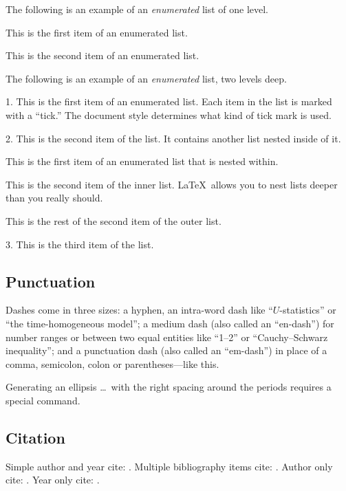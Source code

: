 \documentclass[aoas]{imsart}
\theoremstyle{plain}
\theoremstyle{remark}
\begin{document}
The following is an example of an \emph{enumerated} list of one level.

\begin{longlist}
\item This is the first item of an enumerated list.
\item This is the second item of an enumerated list.
\end{longlist}

The following is an example of an \emph{enumerated} list, two levels deep.
\begin{longlist}
\item[1.]
This is the first item of an enumerated list.  Each item
in the list is marked with a ``tick.''  The document
style determines what kind of tick mark is used.
\item[2.]
This is the second item of the list.  It contains another
list nested inside of it.
\begin{longlist}
\item
This is the first item of an enumerated list that
is nested within.  
\item
This is the second item of the inner list.  \LaTeX\
allows you to nest lists deeper than you really should.
\end{longlist}
This is the rest of the second item of the outer list.
\item[3.]
This is the third item of the list.
\end{longlist}

\subsection{Punctuation}
Dashes come in three sizes: a hyphen, an intra-word dash like ``$U$-statistics'' or ``the time-homogeneous model'';
a medium dash (also called an ``en-dash'') for number ranges or between two equal entities like ``1--2'' or ``Cauchy--Schwarz inequality'';
and a punctuation dash (also called an ``em-dash'') in place of a comma, semicolon,
colon or parentheses---like this.

Generating an ellipsis \ldots\ with the right spacing
around the periods requires a special command.

\subsection{Citation}

Simple author and year cite: \cite{r1}.
Multiple bibliography items cite: \cite{r1,r2}.
Author only cite: \citeauthor{r3}.
Year only cite: \citeyear{r4}.
\end{document}
